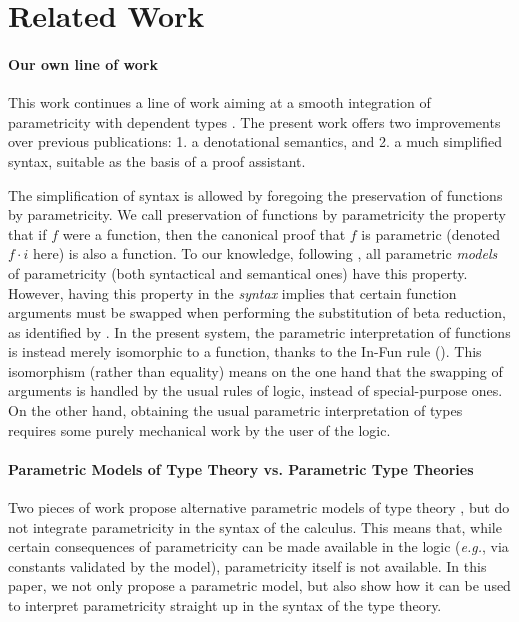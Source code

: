 \documentclass[english]{PaperTools/latex/entcs}
\theoremstyle{plain}
\theoremstyle{definition}
\theoremstyle{remark}
\newcommand\param[1]{\!\cdot\!#1}
\def\eg{\textit{e.g.}}
\begin{document}
\section{Related Work}

\paragraph{Our own line of work}
This work continues a line of work aiming at a smooth integration of
parametricity with dependent types
\citep{bernardy_parametricity_2010,bernardy_realizability_2011,bernardy_proofs_2012,bernardy_computational_2012,bernardy_type-theory_2013}. The present work offers two improvements over previous publications:
1. a denotational semantics, and
2. a much simplified syntax, suitable as the basis of a proof assistant.

The simplification of syntax is allowed by foregoing the preservation
of functions by parametricity. We call preservation of functions by
parametricity the property that if $f$ were a function, then the
canonical proof that $f$ is parametric (denoted $f \param i$ here) is
also a function. To our knowledge, following \citet{reynolds_types_1983}, all parametric \emph{models} of parametricity (both syntactical and semantical ones) have this property.
However, having this property in the \emph{syntax} implies that
certain function arguments must be swapped when performing the
substitution of beta reduction, as identified by
\citet{bernardy_computational_2012}.  In the present system, the
parametric interpretation of functions is instead merely isomorphic to
a function, thanks to the {\sc In-Fun} rule (). This
isomorphism (rather than equality) means on the one hand that the
swapping of arguments is handled by the usual rules of logic, instead
of special-purpose ones. On the other hand, obtaining the usual
parametric interpretation of types requires some purely mechanical
work by the user of the logic.

\paragraph{Parametric Models of Type Theory vs. Parametric Type Theories}
Two pieces of work propose alternative parametric models of
type theory
\citep{atkey_relationally_2014,krishnaswami_internalizing_2013}, but
do not integrate parametricity in the syntax of the calculus. This
means that, while certain consequences of parametricity can be made
available in the logic (\eg, via constants validated by the model),
parametricity itself is not available. In this paper, we not only
propose a parametric model, but also show how it can be used to
interpret parametricity straight up in the syntax of the type theory.
\end{document}
